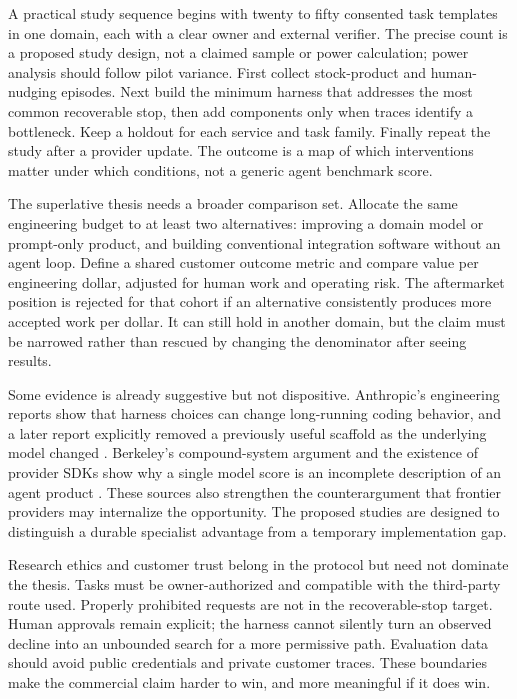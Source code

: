 A practical study sequence begins with twenty to fifty consented task templates in one domain, each with a clear owner and external verifier. The precise count is a proposed study design, not a claimed sample or power calculation; power analysis should follow pilot variance. First collect stock-product and human-nudging episodes. Next build the minimum harness that addresses the most common recoverable stop, then add components only when traces identify a bottleneck. Keep a holdout for each service and task family. Finally repeat the study after a provider update. The outcome is a map of which interventions matter under which conditions, not a generic agent benchmark score.

The superlative thesis needs a broader comparison set. Allocate the same engineering budget to at least two alternatives: improving a domain model or prompt-only product, and building conventional integration software without an agent loop. Define a shared customer outcome metric and compare value per engineering dollar, adjusted for human work and operating risk. The aftermarket position is rejected for that cohort if an alternative consistently produces more accepted work per dollar. It can still hold in another domain, but the claim must be narrowed rather than rescued by changing the denominator after seeing results.

Some evidence is already suggestive but not dispositive. Anthropic's engineering reports show that harness choices can change long-running coding behavior, and a later report explicitly removed a previously useful scaffold as the underlying model changed \citep{anthropiclong,anthropic2026}. Berkeley's compound-system argument and the existence of provider SDKs show why a single model score is an incomplete description of an agent product \citep{compound,openaiagents}. These sources also strengthen the counterargument that frontier providers may internalize the opportunity. The proposed studies are designed to distinguish a durable specialist advantage from a temporary implementation gap.

Research ethics and customer trust belong in the protocol but need not dominate the thesis. Tasks must be owner-authorized and compatible with the third-party route used. Properly prohibited requests are not in the recoverable-stop target. Human approvals remain explicit; the harness cannot silently turn an observed decline into an unbounded search for a more permissive path. Evaluation data should avoid public credentials and private customer traces. These boundaries make the commercial claim harder to win, and more meaningful if it does win.

